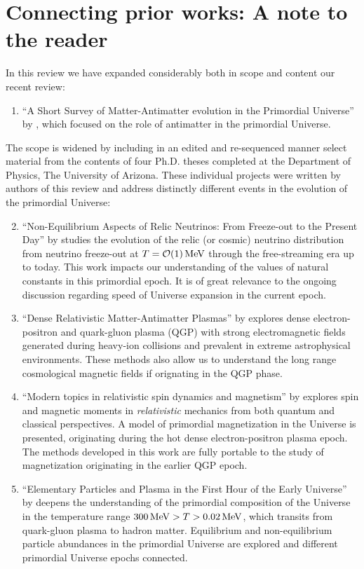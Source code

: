 \section{Connecting prior works: A note to the reader}\label{list:Works}
In this review we have expanded considerably both in scope and content our recent review:
\begin{enumerate}
\item ``A Short Survey of Matter-Antimatter evolution in the Primordial Universe'' by , which focused on the role of antimatter in the primordial Universe. 
\end{enumerate}
The scope is widened by including in an edited and re-sequenced manner select material from the contents of four Ph.D. theses completed at the Department of Physics, The University of Arizona. {\color{blue} These individual projects were written by authors of this review and address distinctly different events in the evolution of the primordial Universe:}
\begin{enumerate}
\setcounter{enumi}{1}
\item ``Non-Equilibrium Aspects of Relic Neutrinos: From Freeze-out to the Present Day'' by  studies the evolution of the relic (or cosmic) neutrino distribution from neutrino freeze-out at $T=\mathcal{O}(1)\text{\,MeV}$ through the free-streaming era up to today. {\color{blue} This work impacts our understanding of the values of natural constants in this primordial epoch. It is of great relevance to the ongoing discussion regarding speed of Universe expansion in the current epoch.}
%
\item ``Dense Relativistic Matter-Antimatter Plasmas'' by  explores dense electron-positron and quark-gluon plasma (QGP) with strong electromagnetic fields generated during heavy-ion collisions and prevalent in extreme astrophysical environments. {\color{blue} These methods also allow us to understand the long range cosmological magnetic fields if orignating in the QGP phase.}
%
\item ``Modern topics in relativistic spin dynamics and magnetism'' by  explores spin and magnetic moments in \emph{relativistic} mechanics from both
quantum and classical perspectives. A model of primordial magnetization in the Universe is presented, originating during the hot dense electron-positron plasma epoch. {\color{blue} The methods developed in this work are fully portable to the study of magnetization originating in the earlier QGP epoch.}
%
\item ``Elementary Particles and Plasma in the First Hour of the Early Universe'' by  deepens the understanding of the primordial composition of the Universe in the temperature range $300 \text{\,MeV}>T>0.02\text{\,MeV}$, which transits from quark-gluon plasma to hadron matter. {\color{blue} Equilibrium and non-equilibrium particle abundances in the primordial Universe are explored and different primordial Universe epochs connected.}
\end{enumerate}

